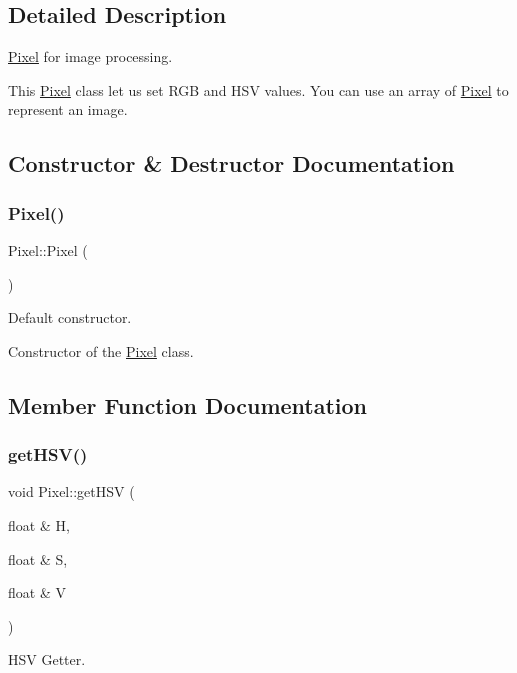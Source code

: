 \subsection{Detailed Description}
\hyperlink{classPixel}{Pixel} for image processing. 

This \hyperlink{classPixel}{Pixel} class let us set R\+GB and H\+SV values. You can use an array of \hyperlink{classPixel}{Pixel} to represent an image. 

\subsection{Constructor \& Destructor Documentation}
\mbox{\label{classPixel_a27ad99a2f705e635c42d242d530d4756}} 
\subsubsection{\texorpdfstring{Pixel()}{Pixel()}}
{\footnotesize\ttfamily Pixel\+::\+Pixel (\begin{DoxyParamCaption}{ }\end{DoxyParamCaption})}



Default constructor. 

Constructor of the \hyperlink{classPixel}{Pixel} class. 

\subsection{Member Function Documentation}
\mbox{\label{classPixel_a70dc52435e31c139f3d04c601e2ca075}} 
\subsubsection{\texorpdfstring{get\+H\+S\+V()}{getHSV()}}
{\footnotesize\ttfamily void Pixel\+::get\+H\+SV (\begin{DoxyParamCaption}\item[{float \&}]{H,  }\item[{float \&}]{S,  }\item[{float \&}]{V }\end{DoxyParamCaption})}



H\+SV Getter. 

